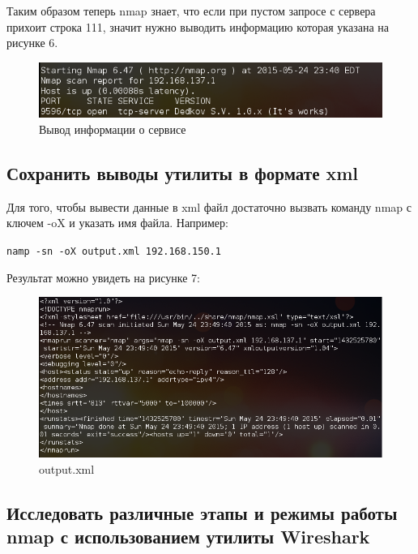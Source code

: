 \documentclass[11pt, a4paper]{article}		%
\begin{document}
Таким образом теперь nmap знает, что если при пустом запросе с сервера прихоит строка 111, значит нужно выводить информацию которая указана на рисунке 6.

\begin{figure}[h!]
\centering
\includegraphics[scale=0.8]{res/server_response}
\caption{Вывод информации о сервисе}
\end{figure}




\subsection{Сохранить выводы утилиты в формате xml}

Для того, чтобы вывести данные в xml файл достаточно вызвать команду nmap с ключем -oX и указать имя файла. Например: 

\verb'namp -sn -oX output.xml 192.168.150.1'

Результат можно увидеть на рисунке 7:

\begin{figure}[h!]
\centering
\includegraphics[scale=0.8]{res/xml_output}
\caption{output.xml}
\end{figure}


\subsection{Исследовать различные этапы и режимы работы nmap с использованием утилиты Wireshark}
\end{document}
